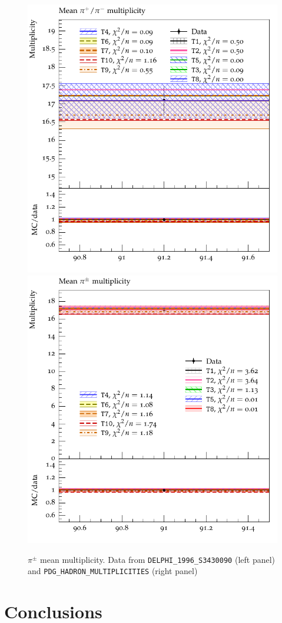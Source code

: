 \documentclass[aps,preprint,floatfix,nofootinbib,showpacs]{revtex4-1}
\begin{document}
\begin{figure}[!h]
 \centering
 \includegraphics[width=0.47\linewidth]{Figures/Mean_multiplicities/DELPHI_1996_S3430090_d36-x01-y01.pdf}
 \hfill
 \includegraphics[width=0.47\linewidth]{Figures/Mean_multiplicities/PDG_HADRON_MULTIPLICITIES_d01-x01-y03.pdf}
 \caption{$\pi^\pm$ mean multiplicity. Data from \texttt{DELPHI\_1996\_S3430090} \cite{Barate:1996fi} (left panel)
 and \texttt{PDG\_HADRON\_MULTIPLICITIES} \cite{Amsler:2008zzb} (right panel)}
 \label{Fig.24}
\end{figure}


\clearpage
\section{Conclusions}

\appendix
\end{document}
